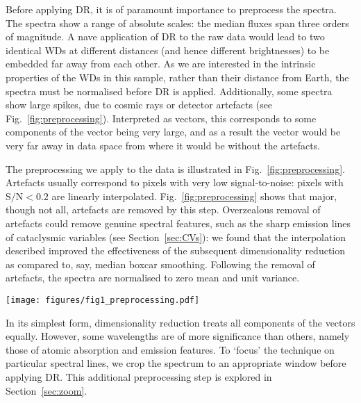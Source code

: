 \documentclass[fleqn,usenatbib]{mnras}
\begin{document}
Before applying DR, it is of paramount importance to preprocess the spectra.
The spectra show a range of absolute scales: the median fluxes span three orders of magnitude.
A nave application of DR to the raw data would lead to two identical WDs at different distances (and hence different brightnesses) to be embedded far away from each other.
As we are interested in the intrinsic properties of the WDs in this sample, rather than their distance from Earth, the spectra must be normalised before DR is applied.
Additionally, some spectra show large spikes, due to cosmic rays or detector artefacts (see Fig.~\ref{fig:preprocessing}).
Interpreted as vectors, this corresponds to some components of the vector being very large, and as a result the vector would be very far away in data space from where it would be without the artefacts.

The preprocessing we apply to the data is illustrated in Fig.~\ref{fig:preprocessing}.
Artefacts usually correspond to pixels with very low signal-to-noise: pixels with $\mathrm{S}/\mathrm{N}<0.2$ are linearly interpolated.
Fig.~\ref{fig:preprocessing} shows that major, though not all, artefacts are removed by this step.
Overzealous removal of artefacts could remove genuine spectral features, such as the sharp emission lines of cataclysmic variables (see Section~\ref{sec:CVs}): we found that the interpolation described improved the effectiveness of the subsequent dimensionality reduction as compared to, say, median boxcar smoothing.
Following the removal of artefacts, the spectra are normalised to zero mean and unit variance.

\begin{figure*}
\centering
\texttt{[image: figures/fig1\_preprocessing.pdf]}
\caption{
    Preprocessing stages, as illustrated on a cherry-picked DESI EDR spectrum.
    The upper panel shows the raw spectrum, with several artefacts.
    The second panel shows that the signal-to-noise ratio is very low near many of these artefacts; where it falls below 0.2, the pixels are interpolated.
    The spectra are then rescaled to zero mean and unit variance, as shown in the lower panel.
    Major artefacts have been removed, though some smaller artefacts remain.
}
\label{fig:preprocessing}
\end{figure*}

In its simplest form, dimensionality reduction treats all components of the vectors equally.
However, some wavelengths are of more significance than others, namely those of atomic absorption and emission features.
To `focus' the technique on particular spectral lines, we crop the spectrum to an appropriate window before applying DR.
This additional preprocessing step is explored in Section~\ref{sec:zoom}.
\end{document}
